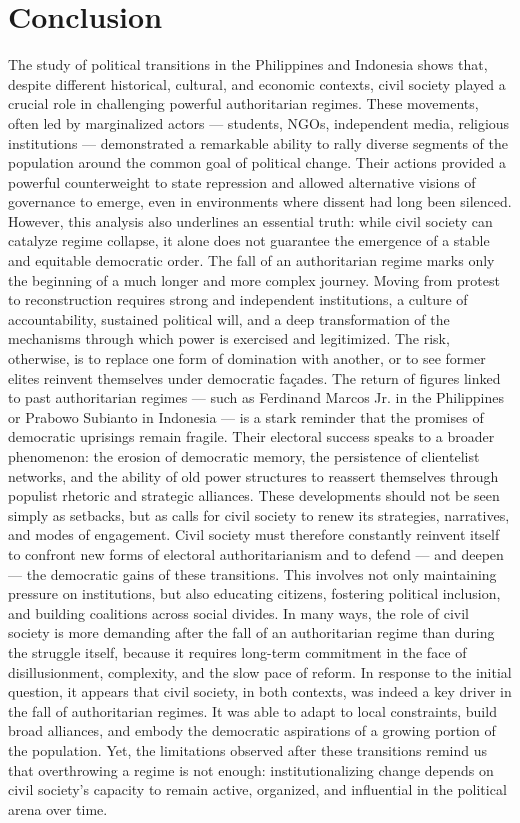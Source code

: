 \documentclass[12pt]{article}
\begin{document}
\section{Conclusion}
The study of political transitions in the Philippines and Indonesia shows that, despite different historical, cultural, and economic contexts, civil society played a crucial role in challenging powerful authoritarian regimes. These movements, often led by marginalized actors — students, NGOs, independent media, religious institutions — demonstrated a remarkable ability to rally diverse segments of the population around the common goal of political change. Their actions provided a powerful counterweight to state repression and allowed alternative visions of governance to emerge, even in environments where dissent had long been silenced.
However, this analysis also underlines an essential truth: while civil society can catalyze regime collapse, it alone does not guarantee the emergence of a stable and equitable democratic order. The fall of an authoritarian regime marks only the beginning of a much longer and more complex journey. Moving from protest to reconstruction requires strong and independent institutions, a culture of accountability, sustained political will, and a deep transformation of the mechanisms through which power is exercised and legitimized. The risk, otherwise, is to replace one form of domination with another, or to see former elites reinvent themselves under democratic façades. The return of figures linked to past authoritarian regimes — such as Ferdinand Marcos Jr. in the Philippines or Prabowo Subianto in Indonesia — is a stark reminder that the promises of democratic uprisings remain fragile. Their electoral success speaks to a broader phenomenon: the erosion of democratic memory, the persistence of clientelist networks, and the ability of old power structures to reassert themselves through populist rhetoric and strategic alliances. These developments should not be seen simply as setbacks, but as calls for civil society to renew its strategies, narratives, and modes of engagement. Civil society must therefore constantly reinvent itself to confront new forms of electoral authoritarianism and to defend — and deepen — the democratic gains of these transitions. This involves not only maintaining pressure on institutions, but also educating citizens, fostering political inclusion, and building coalitions across social divides. In many ways, the role of civil society is more demanding after the fall of an authoritarian regime than during the struggle itself, because it requires long-term commitment in the face of disillusionment, complexity, and the slow pace of reform. In response to the initial question, it appears that civil society, in both contexts, was indeed a key driver in the fall of authoritarian regimes. It was able to adapt to local constraints, build broad alliances, and embody the democratic aspirations of a growing portion of the population. Yet, the limitations observed after these transitions remind us that overthrowing a regime is not enough: institutionalizing change depends on civil society’s capacity to remain active, organized, and influential in the political arena over time. 
\end{document}
